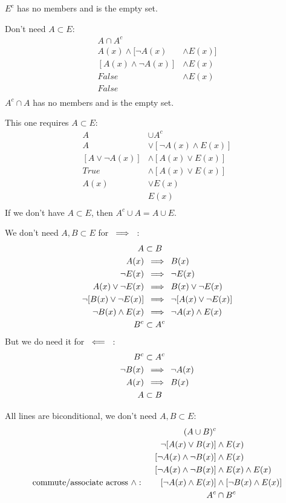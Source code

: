 \documentclass{article}
\newcommand{\nl}[0]{\newline}
\newcommand{\rimp}[1][5]{\kern#1px \Longrightarrow \kern#1px}
\newcommand{\limp}[1][5]{\kern#1px \Longleftarrow \kern#1px}
\newcommand{\cimp}[1][5]{\kern#1px \iff \kern#1px}
\begin{document}
\begin{flushleft}
$E^c$ has no members and is the empty set. \nl

 \nl
Don't need $A \subset E$:
$$\begin{aligned}
A \cap A^c \\
A(x) \wedge [\neg A(x) &\wedge E(x)] \\
[A(x) \wedge \neg A(x)] &\wedge E(x) \\
False &\wedge E(x) \\
False\\
\end{aligned} $$
$A^c \cap A$ has no members and is the empty set. \nl

 \nl
This one requires $A \subset E$:
$$\begin{aligned}
A &\cup A^c \\
A &\vee [\neg A(x) \wedge E(x)]\\
[A \vee \neg A(x)] &\wedge [A(x) \vee E(x)] \\
True &\wedge [A(x) \vee E(x)] \\
A(x) &\vee E(x) \\
&E(x) \\
\end{aligned}$$
If we don't have $A \subset E$, then $A^c \cup A = A \cup E$. \nl

\fbox{$A \subset B \cimp[10] B^c \subset A^c$} \nl
We don't need $A,B \subset E$ for $\rimp$ :
$$\begin{aligned}
A &\subset B \\
A(x) &\rimp B(x) \\
\neg E(x) &\rimp \neg E(x) \\
A(x) \vee \neg E(x) &\rimp B(x) \vee \neg E(x) \\
\neg[B(x) \vee \neg E(x)] &\rimp \neg[A(x) \vee \neg E(x)] \\
\neg B(x) \wedge E(x) &\rimp \neg A(x) \wedge E(x) \\
B^c &\subset A^c \\
\end{aligned}$$
But we do need it for $\limp$ :
$$\begin{aligned}
B^c &\subset A^c\\
\neg B(x) &\rimp \neg A(x)\\
A(x) &\rimp B(x) \\
A &\subset B \\
\end{aligned}$$

 \nl
All lines are biconditional, we don't need $A, B \subset E$:
$$\begin{aligned}
(A \cup B)^c& \\
\neg[A(x) \vee B(x)] &\wedge E(x) \\
[\neg A(x) \wedge \neg B(x)] &\wedge E(x) \\
[\neg A(x) \wedge \neg B(x)] &\wedge E(x) \wedge E(x)\\
\text{commute/associate across } \wedge: \kern20px [\neg A(x) \wedge E(x)] &\wedge [\neg B(x) \wedge E(x)] \\
A^c &\cap B^c \\
\end{aligned}$$


\end{flushleft}
\end{document}
